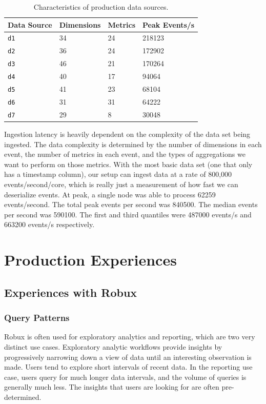 \documentclass{vldb}
\begin{document}
\begin{table}
  \centering
  \scriptsize\begin{tabular}{| l | l | l | l |}
    \hline
    \textbf{Data Source} & \textbf{Dimensions} & \textbf{Metrics} & \textbf{Peak Events/s} \\ \hline
    \texttt{d1} & 34 & 24 & 218123 \\ \hline
    \texttt{d2} & 36 & 24 & 172902 \\ \hline
    \texttt{d3} & 46 & 21 & 170264 \\ \hline
    \texttt{d4} & 40 & 17 & 94064 \\ \hline
    \texttt{d5} & 41 & 23 & 68104 \\ \hline
    \texttt{d6} & 31 & 31 & 64222 \\ \hline
    \texttt{d7} & 29 & 8 & 30048 \\ \hline
  \end{tabular}
  \normalsize
  \caption{Characteristics of production data sources.}
  \label{tab:ingestion}
\end{table}

Ingestion latency is heavily dependent on the complexity of the data set being
ingested. The data complexity is determined by the number of dimensions in each
event, the number of metrics in each event, and the types of aggregations we
want to perform on those metrics. With the most basic data set (one that only
has a timestamp column), our setup can ingest data at a rate of 800,000
events/second/core, which is really just a measurement of how fast we can
deserialize events. At peak, a single node was able to process 62259
events/second. The total peak events per second was
840500. The median events per second was 590100. The first and third quantiles
were 487000 events/s and 663200 events/s respectively. 

\section{Production Experiences}
\label{sec:experiences}

\subsection{Experiences with Robux}
\subsubsection{Query Patterns}
Robux is often used for exploratory analytics and reporting, which are two very
distinct use cases. Exploratory analytic workflows provide insights by
progressively narrowing down a view of data until an interesting observation is
made. Users tend to explore short intervals of recent data. In the reporting
use case, users query for much longer data intervals, and the volume of queries
is generally much less. The insights that users are looking for are often
pre-determined. 
\end{document}

